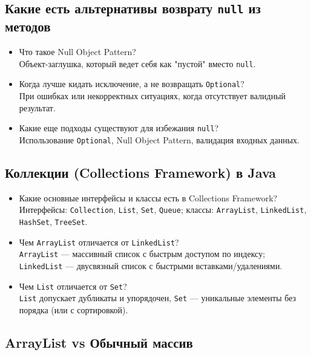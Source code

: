 \documentclass[a4paper,14pt]{article}
\begin{document}
\subsection{Какие есть альтернативы возврату \texttt{null} из методов}

\begin{itemize}
    \item Что такое Null Object Pattern? \\
    Объект-заглушка, который ведет себя как "пустой" вместо \texttt{null}.
    \item Когда лучше кидать исключение, а не возвращать \texttt{Optional}? \\
    При ошибках или некорректных ситуациях, когда отсутствует валидный результат.
    \item Какие еще подходы существуют для избежания \texttt{null}? \\
    Использование \texttt{Optional}, Null Object Pattern, валидация входных данных.
\end{itemize}

\subsection{Коллекции (Collections Framework) в Java}

\begin{itemize}
    \item Какие основные интерфейсы и классы есть в Collections Framework? \\
    Интерфейсы: \texttt{Collection}, \texttt{List}, \texttt{Set}, \texttt{Queue}; классы: \texttt{ArrayList}, \texttt{LinkedList}, \texttt{HashSet}, \texttt{TreeSet}.
    \item Чем \texttt{ArrayList} отличается от \texttt{LinkedList}? \\
    \texttt{ArrayList} — массивный список с быстрым доступом по индексу; \texttt{LinkedList} — двусвязный список с быстрыми вставками/удалениями.
    \item Чем \texttt{List} отличается от \texttt{Set}? \\
    \texttt{List} допускает дубликаты и упорядочен, \texttt{Set} — уникальные элементы без порядка (или с сортировкой).
\end{itemize}

\subsection{ArrayList vs Обычный массив}
\end{document}
